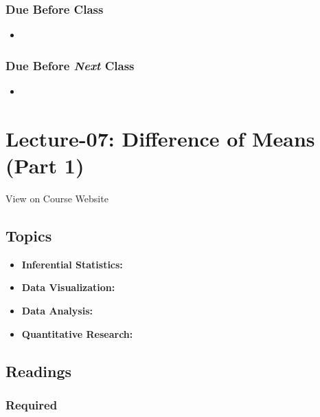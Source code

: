\documentclass[]{book}
\providecommand{\tightlist}{%
  \setlength{\itemsep}{0pt}\setlength{\parskip}{0pt}}
\theoremstyle{definition}
\theoremstyle{definition}
\theoremstyle{definition}
\theoremstyle{remark}
\begin{document}
\subsubsection*{Due Before Class}\label{due-before-class-5}

\begin{itemize}
\item
\end{itemize}

\subsubsection*{\texorpdfstring{Due Before \emph{Next}
Class}{Due Before Next Class}}\label{due-before-next-class-6}

\begin{itemize}
\item
\end{itemize}

\section{Lecture-07: Difference of Means (Part
1)}\label{lecture-07-difference-of-means-part-1}

View on Course Website

\subsection*{Topics}\label{topics-7}

\begin{itemize}
\tightlist
\item
  \textbf{Inferential Statistics:}
\item
  \textbf{Data Visualization:}
\item
  \textbf{Data Analysis:}
\item
  \textbf{Quantitative Research:}
\end{itemize}

\subsection*{Readings}\label{readings-8}

\subsubsection*{Required}\label{required-7}
\end{document}
